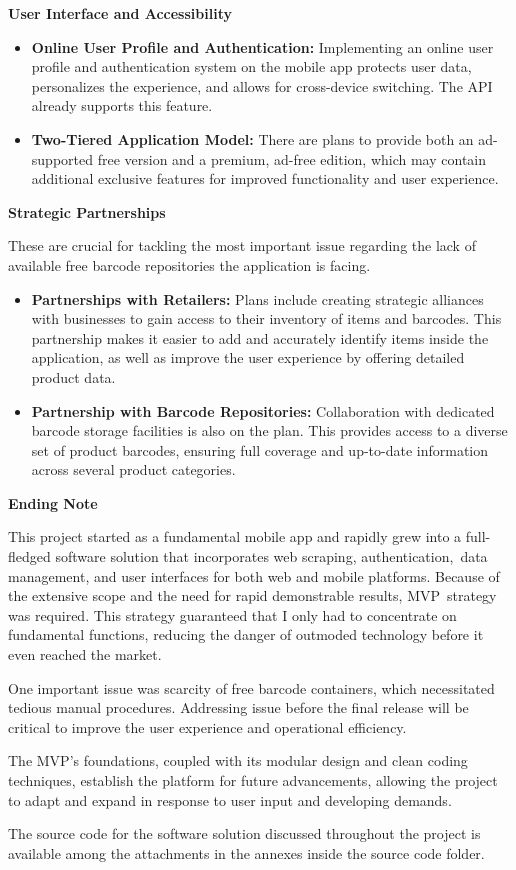 \pagebreak

\noindent\textbf{User Interface and Accessibility}

\begin{itemize}
	\item \textbf{Online User Profile and Authentication:} Implementing an online user profile and authentication system on the mobile app protects user data, personalizes the experience, and allows for cross-device switching. The API already supports this feature.
	\item \textbf{Two-Tiered Application Model:} There are plans to provide both an ad-supported free version and a premium, ad-free edition, which may contain additional exclusive features for improved functionality and user experience.
\end{itemize}

\noindent\textbf{Strategic Partnerships}

These are crucial for tackling the most important issue regarding the lack of available free barcode repositories the application is facing.

\begin{itemize}
	\item \textbf{Partnerships with Retailers:} Plans include creating strategic alliances with businesses to gain access to their inventory of items and barcodes. This partnership makes it easier to add and accurately identify items inside the application, as well as improve the user experience by offering detailed product data.
	\item \textbf{Partnership with Barcode Repositories:} Collaboration with dedicated barcode storage facilities is also on the plan. This provides access to a diverse set of product barcodes, ensuring full coverage and up-to-date information across several product categories.
\end{itemize}

\noindent\textbf{Ending Note}

This project started as a fundamental mobile app and rapidly grew into a full-fledged software solution that incorporates web scraping, authentication, data management, and user interfaces for both web and mobile platforms. Because of the extensive scope and the need for rapid demonstrable results, MVP strategy was required. This strategy guaranteed that I only had to concentrate on fundamental functions, reducing the danger of outmoded technology before it even reached the market.

One important issue was scarcity of free barcode containers, which necessitated tedious manual procedures. Addressing issue before the final release will be critical to improve the user experience and operational efficiency.

The MVP's foundations, coupled with its modular design and clean coding techniques, establish the platform for future advancements, allowing the project to adapt and expand in response to user input and developing demands.

The source code for the software solution discussed throughout the project is available among the attachments in the annexes inside the source code folder.

